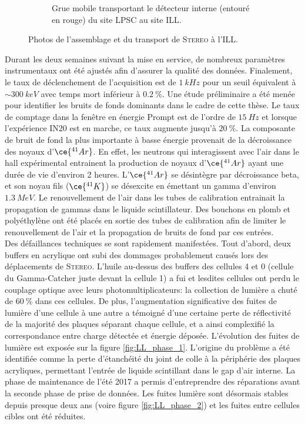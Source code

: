 {\begin{figure}[h!]
\begin{subfigure}[b]{0.49\textwidth}
\caption{Grue mobile transportant le détecteur interne (entouré en rouge) du site LPSC au site ILL.} 
\label{fig:stereo_trans.png} 
\end{subfigure} 
\caption[Photos de l'assemblage et du transport de \textsc{Stereo} à l'ILL]{Photos de l'assemblage et du transport de \textsc{Stereo} à l'ILL.} 
\label{fig:} 
\end{figure} 

} 

Durant les deux semaines suivant la mise en service, de nombreux paramètres instrumentaux ont été ajustés afin d'assurer la qualité des données. Finalement, le taux de déclenchement de l'acquisition est de $\SI{1}{kHz}$ pour un seuil équivalent à $\sim \SI{300}{keV}$ avec temps mort inférieur à $\SI{0.2}{\%}$. Une étude préliminaire a été menée pour identifier les bruits de fonds dominants dans le cadre de cette thèse. Le taux de comptage dans la fenêtre en énergie Prompt est de l'ordre de $\SI{15}{Hz}$ et lorsque l'expérience IN20 est en marche, ce taux augmente jusqu'à $\SI{20}{\%}$. La composante de bruit de fond la plus importante à basse énergie provenait de la décroissance des noyaux d'$\ce{^{41}Ar}$. En effet, les neutrons qui interagissent avec l'air dans le hall expérimental entrainent la production de noyaux d'$\ce{^{41}Ar}$ ayant une durée de vie d'environ 2 heures. L'$\ce{^{41}Ar}$ se désintègre par décroissance beta, et son noyau fils ($\ce{^{41}K}$) se désexcite en émettant un gamma d'environ $\SI{1.3}{MeV}$. Le renouvellement de l'air dans les tubes de calibration entrainait la propagation de gammas dans le liquide scintillateur. Des bouchons en plomb et polyéthylène ont été placés en sortie des tubes de calibration afin de limiter le renouvellement de l'air et la propagation de bruits de fond par ces entrées.\\ 

Des défaillances techniques se sont rapidement manifestées. Tout d'abord, deux buffers en acrylique ont subi des dommages probablement causés lors des déplacements de \textsc{Stereo}. L'huile au-dessus des buffers des cellules 4 et 0 (cellule du Gamma-Catcher juste devant la cellule 1) a fui et lesdites cellules ont perdu le couplage optique avec leurs photomultiplicateurs: la collection de lumière a chuté de $\SI{60}{\%}$ dans ces cellules. De plus, l'augmentation significative des fuites de lumière d'une cellule à une autre a témoigné d'une certaine perte de réflectivité de la majorité des plaques séparant chaque cellule, et a ainsi complexifié la correspondance entre charge détectée et énergie déposée. L'évolution des fuites de lumière est exposée sur la figure \ref{fig:LL_phase_1}. L'origine du problème a été identifiée comme la perte d'étanchéité du joint de colle à la périphérie des plaques acryliques, permettant l'entrée de liquide scintillant dans le gap d'air interne. La phase de maintenance de l'été 2017 a permis d'entreprendre des réparations avant la seconde phase de prise de données. Les fuites lumière sont désormais stables depuis presque deux ans (voire figure \ref{fig:LL_phase_2}) et les fuites entre cellules cibles ont été réduites.\\ 

